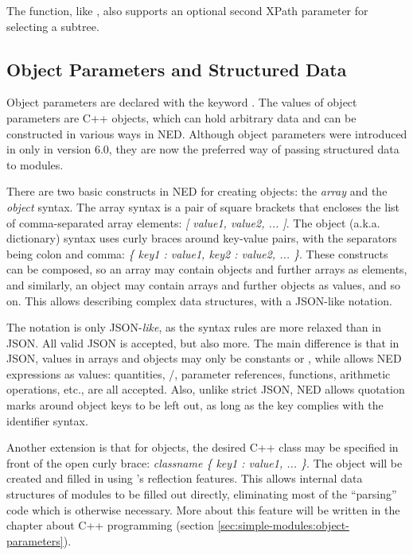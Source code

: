 The  function, like , also supports an
optional second XPath parameter for selecting a subtree.



\subsection{Object Parameters and Structured Data}
\label{sec:ned-lang:object-parameters}

Object parameters are declared with the keyword . The values of
object parameters are C++ objects, which can hold arbitrary data and can be
constructed in various ways in NED. Although object parameters were introduced
in {\opp} only in version 6.0, they are now the preferred way of passing
structured data to modules.

There are two basic constructs in NED for creating objects: the \textit{array}
and the \textit{object} syntax. The array syntax is a pair of square brackets
that encloses the list of comma-separated array elements: \textit{[ value1,
value2, ... ]}. The object (a.k.a. dictionary) syntax uses curly braces around
key-value pairs, with the separators being colon and comma: \textit{\{ key1 :
value1, key2 : value2, ... \}}. These constructs can be composed, so an array
may contain objects and further arrays as elements, and similarly, an object may
contain arrays and further objects as values, and so on. This allows describing
complex data structures, with a JSON-like notation.

The notation is only JSON-\textit{like}, as the syntax rules are more relaxed
than in JSON. All valid JSON is accepted, but also more. The main difference is
that in JSON, values in arrays and objects may only be constants or ,
while {\opp} allows NED expressions as values: quantities,
/, parameter references, functions, arithmetic
operations, etc., are all accepted. Also, unlike strict JSON, NED allows quotation
marks around object keys to be left out, as long as the key complies with
the identifier syntax.

Another extension is that for objects, the desired C++ class may be specified in
front of the open curly brace: \textit{classname \{ key1 : value1, ... \}}. The
object will be created and filled in using {\opp}'s reflection features. This
allows internal data structures of modules to be filled out directly,
eliminating most of the ``parsing'' code which is otherwise necessary. More about
this feature will be written in the chapter about C++ programming (section
\ref{sec:simple-modules:object-parameters}).

